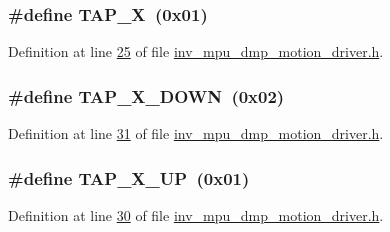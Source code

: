 \subsubsection[{\texorpdfstring{T\+A\+P\+\_\+X}{TAP_X}}]{\setlength{\rightskip}{0pt plus 5cm}\#define T\+A\+P\+\_\+X~(0x01)}\hypertarget{group___d_r_i_v_e_r_s_ga22a5ea75ee18a788b441f66fffe83586}{}\label{group___d_r_i_v_e_r_s_ga22a5ea75ee18a788b441f66fffe83586}


Definition at line \hyperlink{inv__mpu__dmp__motion__driver_8h_source_l00025}{25} of file \hyperlink{inv__mpu__dmp__motion__driver_8h_source}{inv\+\_\+mpu\+\_\+dmp\+\_\+motion\+\_\+driver.\+h}.

\subsubsection[{\texorpdfstring{T\+A\+P\+\_\+\+X\+\_\+\+D\+O\+WN}{TAP_X_DOWN}}]{\setlength{\rightskip}{0pt plus 5cm}\#define T\+A\+P\+\_\+\+X\+\_\+\+D\+O\+WN~(0x02)}\hypertarget{group___d_r_i_v_e_r_s_gad3263c4a492cc11a014800d4a6e3311a}{}\label{group___d_r_i_v_e_r_s_gad3263c4a492cc11a014800d4a6e3311a}


Definition at line \hyperlink{inv__mpu__dmp__motion__driver_8h_source_l00031}{31} of file \hyperlink{inv__mpu__dmp__motion__driver_8h_source}{inv\+\_\+mpu\+\_\+dmp\+\_\+motion\+\_\+driver.\+h}.

\subsubsection[{\texorpdfstring{T\+A\+P\+\_\+\+X\+\_\+\+UP}{TAP_X_UP}}]{\setlength{\rightskip}{0pt plus 5cm}\#define T\+A\+P\+\_\+\+X\+\_\+\+UP~(0x01)}\hypertarget{group___d_r_i_v_e_r_s_gaa979b4cd872ade6f4904199e83e9f3f4}{}\label{group___d_r_i_v_e_r_s_gaa979b4cd872ade6f4904199e83e9f3f4}


Definition at line \hyperlink{inv__mpu__dmp__motion__driver_8h_source_l00030}{30} of file \hyperlink{inv__mpu__dmp__motion__driver_8h_source}{inv\+\_\+mpu\+\_\+dmp\+\_\+motion\+\_\+driver.\+h}.

